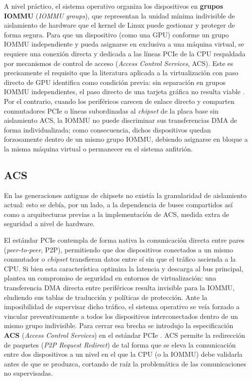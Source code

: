 A nivel práctico, el sistema operativo organiza los dispositivos en \textbf{grupos IOMMU} (\textit{IOMMU groups}), que 
representan la unidad 
mínima indivisible de aislamiento de hardware que el kernel de Linux puede gestionar y proteger de forma segura. Para que un 
dispositivo (como una GPU) conforme un grupo IOMMU independiente y pueda 
asignarse en exclusiva 
a una máquina virtual, se requiere una conexión directa y dedicada a las líneas PCIe de la CPU respaldada por mecanismos 
de control de acceso 
(\textit{Access Control Services}, ACS). Este es precisamente el requisito que la literatura 
 aplicada a la virtualización con paso directo de GPU identifica como condición previa: sin 
 separación en grupos IOMMU independientes, el paso directo de una tarjeta gráfica no resulta 
 viable \cite{heiko_iommu_groups}. Por el contrario, cuando los periféricos carecen de enlace directo y comparten 
conmutadores PCIe o 
líneas subordinadas al \textit{chipset} de la placa base sin aislamiento ACS, la IOMMU no puede discriminar sus 
transferencias DMA de forma 
individualizada; como consecuencia, dichos dispositivos quedan forzosamente dentro de un mismo grupo IOMMU, debiendo 
asignarse en bloque a
la misma máquina virtual o permanecer en el sistema anfitrión.

\subsection{ACS}

En las generaciones antiguas de chipsets no existía la granularidad de aislamiento actual: esto se debía, por un lado, a la dependencia de
buses compartidos así como a arquitecturas previas a la implementación de ACS, medida extra de seguridad a 
nivel de hardware.

El estándar PCIe contempla de forma nativa la comunicación directa entre pares (\textit{peer-to-peer}, P2P), permitiendo que dos 
dispositivos conectados a un mismo conmutador o \textit{chipset} transfieran datos entre sí sin que el tráfico ascienda a la CPU. 
Si bien esta característica optimiza la latencia y descarga al bus principal, plantea un compromiso de seguridad en entornos de 
virtualización: una transferencia DMA directa entre periféricos resulta invisible para la IOMMU, eludiendo sus tablas de traducción y 
políticas de protección. Ante la imposibilidad de supervisar dicho tráfico, el sistema operativo se veía forzado a 
vincular preventivamente a todos los dispositivos interconectados dentro de un mismo grupo indivisible.
Para cerrar esa brecha se introdujo la especificación \textbf{ACS} (\textit{Access Control Services}) en el estándar
PCIe \cite{pcisig2022,heiko_iommu_groups}. ACS permite la redirección de paquetes (\textit{P2P Request Redirect}) de tal forma que se
eleva la comunicación entre dos dispositivos a un nivel en el que la CPU (o la IOMMU) debe 
validarla antes de que se produzca, cortando de raíz la problemática de las comunicaciones no supervisadas. 

